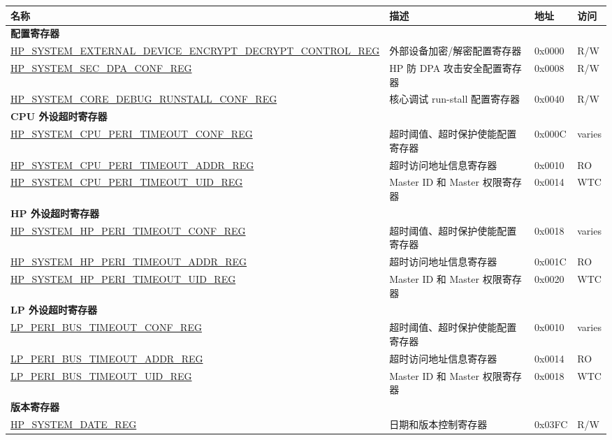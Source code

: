\begin{longtable}{ | p{12cm} | p{7.2cm} | p{1.3cm} | p{1cm} | }
\hline\rowcolor{lightgray}
名称 & 描述 &  地址 & 访问 \\ \hline
\endhead
\multicolumn{4}{|l|}{\textbf{配置寄存器}} \\ \hline
\hyperref[regdesc:HPSYSTEMEXTERNALDEVICEENCRYPTDECRYPTCONTROLREG]{HP\_SYSTEM\_EXTERNAL\_DEVICE\_ENCRYPT\_DECRYPT\_CONTROL\_REG} & 外部设备加密/解密配置寄存器 & 0x0000 & R/W \\ \hline
\hyperref[regdesc:HPSYSTEMSECDPACONFREG]{HP\_SYSTEM\_SEC\_DPA\_CONF\_REG} & HP 防 DPA 攻击安全配置寄存器 & 0x0008 & R/W \\ \hline
\hyperref[regdesc:HPSYSTEMCOREDEBUGRUNSTALLCONFREG]{HP\_SYSTEM\_CORE\_DEBUG\_RUNSTALL\_CONF\_REG} & 核心调试 run-stall 配置寄存器 & 0x0040 & R/W \\ \hline
\multicolumn{4}{|l|}{\textbf{CPU 外设超时寄存器}} \\ \hline
\hyperref[regdesc:HPSYSTEMCPUPERITIMEOUTCONFREG]{HP\_SYSTEM\_CPU\_PERI\_TIMEOUT\_CONF\_REG} & 超时阈值、超时保护使能配置寄存器 & 0x000C & varies \\ \hline
\hyperref[regdesc:HPSYSTEMCPUPERITIMEOUTADDRREG]{HP\_SYSTEM\_CPU\_PERI\_TIMEOUT\_ADDR\_REG} & 超时访问地址信息寄存器 & 0x0010 & RO \\ \hline
\hyperref[regdesc:HPSYSTEMCPUPERITIMEOUTUIDREG]{HP\_SYSTEM\_CPU\_PERI\_TIMEOUT\_UID\_REG} & Master ID 和 Master 权限寄存器 & 0x0014 & WTC \\ \hline
\multicolumn{4}{|l|}{\textbf{HP 外设超时寄存器}} \\ \hline
\hyperref[regdesc:HPSYSTEMHPPERITIMEOUTCONFREG]{HP\_SYSTEM\_HP\_PERI\_TIMEOUT\_CONF\_REG} & 超时阈值、超时保护使能配置寄存器 & 0x0018 & varies \\ \hline
\hyperref[regdesc:HPSYSTEMHPPERITIMEOUTADDRREG]{HP\_SYSTEM\_HP\_PERI\_TIMEOUT\_ADDR\_REG} & 超时访问地址信息寄存器 & 0x001C & RO \\ \hline
\hyperref[regdesc:HPSYSTEMHPPERITIMEOUTUIDREG]{HP\_SYSTEM\_HP\_PERI\_TIMEOUT\_UID\_REG} & Master ID 和 Master 权限寄存器 & 0x0020 & WTC \\ \hline
\multicolumn{4}{|l|}{\textbf{LP 外设超时寄存器}} \\ \hline
\hyperref[regdesc:LPPERIBUSTIMEOUTCONFREG]{LP\_PERI\_BUS\_TIMEOUT\_CONF\_REG} & 超时阈值、超时保护使能配置寄存器 & 0x0010 & varies \\ \hline
\hyperref[regdesc:LPPERIBUSTIMEOUTADDRREG]{LP\_PERI\_BUS\_TIMEOUT\_ADDR\_REG} & 超时访问地址信息寄存器 & 0x0014 & RO \\ \hline
\hyperref[regdesc:LPPERIBUSTIMEOUTUIDREG]{LP\_PERI\_BUS\_TIMEOUT\_UID\_REG} & Master ID 和 Master 权限寄存器 & 0x0018 & WTC \\ \hline
\multicolumn{4}{|l|}{\textbf{版本寄存器}} \\ \hline
\hyperref[regdesc:HPSYSTEMDATEREG]{HP\_SYSTEM\_DATE\_REG} & 日期和版本控制寄存器 & 0x03FC & R/W \\ \hline
\end{longtable}
